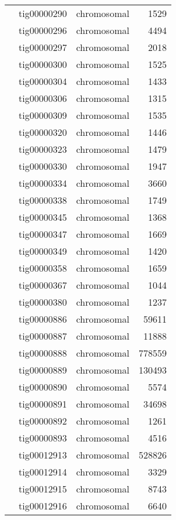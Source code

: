 {\begin{supertabular}{llcr}
         & tig00000290 & chromosomal & 1529 \\
         & tig00000296 & chromosomal & 4494 \\
         & tig00000297 & chromosomal & 2018 \\
         & tig00000300 & chromosomal & 1525 \\
         & tig00000304 & chromosomal & 1433 \\
         & tig00000306 & chromosomal & 1315 \\
         & tig00000309 & chromosomal & 1535 \\
         & tig00000320 & chromosomal & 1446 \\
         & tig00000323 & chromosomal & 1479 \\
         & tig00000330 & chromosomal & 1947 \\
         & tig00000334 & chromosomal & 3660 \\
         & tig00000338 & chromosomal & 1749 \\
         & tig00000345 & chromosomal & 1368 \\
         & tig00000347 & chromosomal & 1669 \\
         & tig00000349 & chromosomal & 1420 \\
         & tig00000358 & chromosomal & 1659 \\
         & tig00000367 & chromosomal & 1044 \\
         & tig00000380 & chromosomal & 1237 \\
         & tig00000886 & chromosomal & 59611 \\
         & tig00000887 & chromosomal & 11888 \\
         & tig00000888 & chromosomal & 778559 \\
         & tig00000889 & chromosomal & 130493 \\
         & tig00000890 & chromosomal & 5574 \\
         & tig00000891 & chromosomal & 34698 \\
         & tig00000892 & chromosomal & 1261 \\
         & tig00000893 & chromosomal & 4516 \\
         & tig00012913 & chromosomal & 528826 \\
         & tig00012914 & chromosomal & 3329 \\
         & tig00012915 & chromosomal & 8743 \\
         & tig00012916 & chromosomal & 6640 \\

\end{supertabular}}

